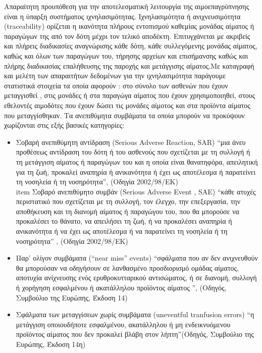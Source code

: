 		
	Απαραίτητη προυπόθεση για την αποτελεσματική λειτουργία της αιμοεπαγρύπνησης είναι η 	ύπαρξη συστήματος ιχνηλασιμότητας. Ιχνηλασιμότητα ή ανιχνευσιμότητα (traceability) ορίζεται η ικανότητα πλήρους εντοπισμού καθεμίας μονάδας αίματος ή παραγώγων της από τον δότη μέχρι τον τελικό αποδέκτη. Επιτυγχάνεται  με ακριβείς και πλήρεις διαδικασίες αναγνώρισης κάθε δότη, κάθε συλλεγόμενης μονάδας αίματος, καθώς και όλων των παραγώγων του, τήρησης αρχείων και επισήμανσης καθώς και πλήρης διαδικασίας επαλήθευσης της παροχής και μετάγγισης αίματος.Με καταγραφή και μελέτη των απαραιτήτων  δεδομένων για την ιχνηλασιμότητα παράγουμε στατιστικά στοιχεία τα οποία αφορούν : στο  σύνολο των ασθενών που έχουν μεταγγισθεί , στις μονάδες ή στα παραγώγα αίματος που έχουν χρησιμοποιηθεί, στους εθελοντές αιμοδότες που έχουν δώσει τις μονάδες αίμοτος και στα προϊόντα αίματος που μεταγγίσθηκαν. 
		Τα ανεπιθύμητα συμβάματα τα οποία μπορούν να προκύψουν χωρίζονται στις εξής βασικές κατηγορίες:
		\begin{itemize}
		\item	 Σοβαρή ανεπιθύμητη αντίδραση (Serious Adverse Reaction, SAR)
		 “μια άνευ προθέσεως αντίδραση του δότη ή του ασθενούς που σχετίζεται με τη συλλογή ή τη μετάγγιση αίματος ή παραγώγων του 			και η οποία είναι θανατηφόρα, απειλητική για τη ζωή, προκαλεί αναπηρία ή ανικανότητα ή έχει ως αποτέλεσμα ή παρατείνει τη νοσηλεία ή τη νοσηρότητα”, (Οδηγία 2002/98/ΕΚ)
 		\\item Σοβαρό ανεπιθύμητο συμβάν (Serious Adverse Event , SAE)
 		“κάθε ατυχές περιστατικό που σχετίζεται με τη συλλογή, τον έλεγχο, την επεξεργασία, την αποθήκευση και τη διανομή αίματος ή 				παραγώγου του, που θα μπορούσε να προκαλέσει το θάνατο, να απειλήσει τη ζωή, ή να προκαλέσει αναπηρία ή ανικανότητα ή να έχει ως αποτέλεσμα ή να παρατείνει τη νοσηλεία ή τη νοσηρότητα” , (Οδηγία 2002/98/ΕΚ)
 		\item Παρ’ ολίγον συμβάματα (“near miss” events)
 		 “σφάλματα που αν δεν ανιχνευθούν θα μπορούσαν να οδηγήσουν σε λανθασμένο προσδιορισμό ομάδας αίματος, αποτυχία
 		 ανίχνευσης ενός ερυθροκυτταρικού αντισώματος, ή σε διανομή, συλλογή ή χορήγηση εσφαλμένου ή ακατάλληλου προϊόντος
 		 αίματος ”, (Οδηγός, Συμβούλιο της Ευρώπης, Έκδοση 14) 
 		 \item Σφάλματα των μεταγγίσεων χωρίς συμβάματα (uneventful tranfusion errors)
 		 “η μετάγγιση οποιουδήποτε εσφαλμένου, ακατάλληλου ή μη ενδεικνυόμενου προϊόντος αίματος που δεν προκαλεί βλάβη στον 					λήπτη”(Οδηγός, Συμβούλιο της Ευρώπης, Έκδοση 14η)
 		 \end{itemize} 
